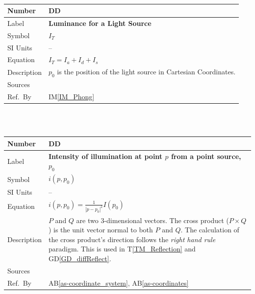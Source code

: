\documentclass[12pt]{article}
\newcommand{\colAwidth}{0.13\textwidth}
\newcommand{\colBwidth}{0.82\textwidth}
\newcounter{defnum} %
\newcommand{\dref}[1]{GD\ref{#1}}
\newcounter{datadefnum} %
\newcommand{\tref}[1]{T\ref{#1}}
\newcommand{\aBref}[1]{AB\ref{#1}}
\newcommand{\iref}[1]{IM\ref{#1}}
\begin{document}
~\newline

\noindent
\begin{minipage}{\textwidth}
	\renewcommand*{\arraystretch}{1.5}
	\begin{tabular}{| p{\colAwidth} | p{\colBwidth}|}
		\hline
		\rowcolor[gray]{0.9}
		Number& DD{datadefnum}\thedatadefnum 
		\label{DD_Intensity_Total}\\
		\hline
		Label& \bf Luminance for a Light Source\\
		\hline
		Symbol &$I_{T}$\\
		\hline
		SI Units & --\\
		\hline
		Equation&$I_{T} = I_{a} + I_{d} + I_{s}$ \\
		\hline
		Description & $p_{0}$ is the position of the light source in Cartesian 
		Coordinates.
		\\
		\hline
		Sources& \cite{shreiner2012}\\
		\hline
		Ref.\ By & \iref{IM_Phong} \\
		\hline
	\end{tabular}
\end{minipage}\\

~\newline

\noindent
\begin{minipage}{\textwidth}
	\renewcommand*{\arraystretch}{1.5}
	\begin{tabular}{| p{\colAwidth} | p{\colBwidth}|}
		\hline
		\rowcolor[gray]{0.9}
		Number& DD{datadefnum}\thedatadefnum 
		\label{DD_Intensity_PointSource_Distance}\\
		\hline
		Label& \bf Intensity of illumination at point $p$ from a point source, 
		$p_{0}$\\
		\hline
		Symbol &$i(p, p_{0})$\\
		\hline
		SI Units & --\\
		\hline
		Equation&$i(p, p_{0}) = \frac{1}{|p-p_{0}|^2} I(p_{0})$\\
		\hline
		Description & $P$ and $Q$ are two $3$-dimensional vectors. The cross 
		product ($P\times Q$) is the unit vector normal to both $P$ and $Q$. 
		The calculation of the cross product's direction follows the 
		\textit{right hand rule} paradigm. This is used in \tref{TM_Reflection} 
		and \dref{GD_diffReflect}.
		\\
		\hline
		Sources& \cite{Lengyel2003}\\
		\hline
		Ref.\ By & \aBref{as-coordinate_system}, \aBref{as-coordinates} \\
		\hline
	\end{tabular}
\end{minipage}\\
\end{document}
